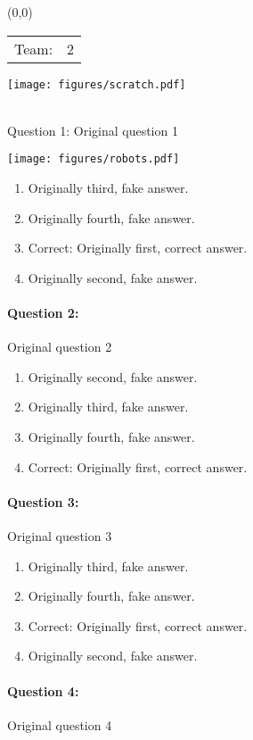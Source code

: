 \documentclass[9pt, twoside, twocolumn]{extarticle}
\renewcommand{\includegraphics}[2][]{\OldIncludegraphics[width=\linewidth, #1]{#2}}
\renewcommand{\caption}{}
\newcommand{\teamprefix}[2]{%
\begin{textblock}{3.5}(0,0)
\begin{tabular}{ll}
Team: & \huge\linespread{6} #1
\end{tabular}

\texttt{[image: figures/scratch.pdf]}

\end{textblock}
\textcolor{white}{.}\\ %
\vspace{10cm}
}%
\let\origfigure=\figure
\let\endorigfigure=\endfigure
\renewenvironment{figure}[1][]{%
  \origfigure[H]
}{%
  \endorigfigure
}
\begin{document}
\teamprefix{2}

\paragraph{Question 1:}
Original question 1

\begin{figure}\centering
\texttt{[image: figures/robots.pdf]}
\caption{\end{figure}
\begin{enumerate}[label=\textbf{{\Alph*}},labelindent=0pt, labelsep=1.5em, parsep=0.2em]
\item Originally third, fake answer.
\item Originally fourth, fake answer.
\item Correct: Originally first, correct answer.
\item Originally second, fake answer.
\end{enumerate}
\paragraph{Question 2:}
Original question 2

\begin{enumerate}[label=\textbf{{\Alph*}},labelindent=0pt, labelsep=1.5em, parsep=0.2em]
\item Originally second, fake answer.
\item Originally third, fake answer.
\item Originally fourth, fake answer.
\item Correct: Originally first, correct answer.
\end{enumerate}
\paragraph{Question 3:}
Original question 3

\begin{enumerate}[label=\textbf{{\Alph*}},labelindent=0pt, labelsep=1.5em, parsep=0.2em]
\item Originally third, fake answer.
\item Originally fourth, fake answer.
\item Correct: Originally first, correct answer.
\item Originally second, fake answer.
\end{enumerate}
\paragraph{Question 4:}
Original question 4
\end{document}
